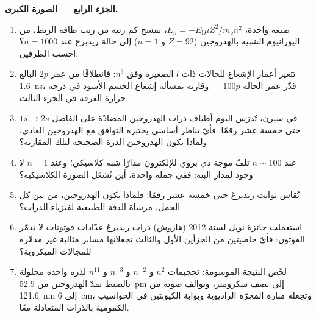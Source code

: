 \begin{problem}
\medskip\noindent\textbf{الجزء الرابع --- الصورة الكبرى.}
\begin{enumerate}[resume]
  \item صيغة واحدة، $E_n = -E_{\text{I}}\mu Z^2/m_{\text{e}}n^2$،
        تمسح كم رتبة من رتب طاقة الربط، من
        اليورانيوم الشبيه بالهدروجين ($Z = 92$ و $n = 1$) إلى
        حالة ريدبرغ عند $n = 1000$؟ احسب الطرفين.
  \item تتغير أعمار الإشعاع للحالات ذات $l$ الصغيرة وفق $n^3$:
        فانطلاقًا من عمر $2p$ البالغ \qty{1.6}{ns}، قدّر عمر
        الحالة $100p$ --- وقارنه بمسألة إشعاع الجسم الأسود في
        درجة حرارة الغرفة في الجزء الثالث.
  \item في سيرن، تُدرَس اليوم أطياف ذرات الهدروجين المضادّة
        على الفاصل $1s \to 2s$ حتى خمسة عشر رقمًا: فأيّ
        تناظر أساسي يختبره التوافق مع الهدروجين العادي،
        ولماذا يكون الهدروجين الذرة الصحيحة لتلك
        المقارنة؟
  \item عند $n \sim 100$ تلفّ موجة دي بروي للإلكترون مدارًا
        شبه كلاسيكي؛ وعند $n = 1$ لا وجود لمدار البتة:
        ففي جملة واحدة، أين تُشعَل الصورة الكلاسيكية؟
  \item تُقاس ثوابت ريدبرغ حتى خمسة عشر رقمًا: فلماذا يكون
        الهدروجين، من بين كل الجمل، مرساة الدقة الطبيعية لفيزياء
        الذرات؟
  \item استعملت جائزة نوبل لسنة 2012 (هاروش) ذرات ريدبرغ
        عدّادات فوتونات لا تدمّر الفوتون: فأيّ خاصيتين
        من الجزأين الأول والثالث تجعلانها مسابر
        مثالية غير مدمِّرة للمجالات الميكروية؟
  \item لخّص النتيجة الموسومة: تحجيمات $n^2$ و $n^{-2}$ و $n^{-3}$
        و $n^{11}$ لذرة واحدة محلولة بالضبط تمدّ
        الهدروجين من \qty{52.9}{pm} إلى نصف ميكرومتر، وتوالف
        صوته من \qty{121.6}{nm} إلى \qty{6}{cm}، وتجعله
        منارة المجرّة الراديوية وبوابة الكيوبتين في
        الحواسيب الكمومية بالذرات المتعادلة معًا.
\end{enumerate}
\end{problem}
